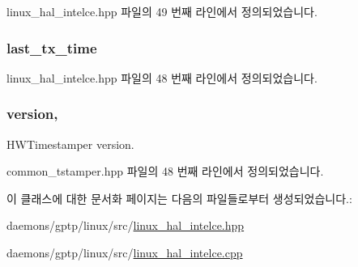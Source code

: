 linux\+\_\+hal\+\_\+intelce.\+hpp 파일의 49 번째 라인에서 정의되었습니다.

\subsubsection[{\texorpdfstring{last\+\_\+tx\+\_\+time}{last_tx_time}}]{ last\+\_\+tx\+\_\+time\hspace{0.3cm}{\ttfamily [private]}}\hypertarget{class_linux_timestamper_intel_c_e_ad099415a2577527cc1f7a0258f050d57}{}\label{class_linux_timestamper_intel_c_e_ad099415a2577527cc1f7a0258f050d57}


linux\+\_\+hal\+\_\+intelce.\+hpp 파일의 48 번째 라인에서 정의되었습니다.

\subsubsection[{\texorpdfstring{version}{version}}]{ version\hspace{0.3cm}{\ttfamily [protected]}, {\ttfamily [inherited]}}\hypertarget{class_common_timestamper_ab22abc2906422da61885ac6c8e6a1a59}{}\label{class_common_timestamper_ab22abc2906422da61885ac6c8e6a1a59}


H\+W\+Timestamper version. 



common\+\_\+tstamper.\+hpp 파일의 48 번째 라인에서 정의되었습니다.



이 클래스에 대한 문서화 페이지는 다음의 파일들로부터 생성되었습니다.\+:\begin{DoxyCompactItemize}
\item 
daemons/gptp/linux/src/\hyperlink{linux__hal__intelce_8hpp}{linux\+\_\+hal\+\_\+intelce.\+hpp}\item 
daemons/gptp/linux/src/\hyperlink{linux__hal__intelce_8cpp}{linux\+\_\+hal\+\_\+intelce.\+cpp}\end{DoxyCompactItemize}
